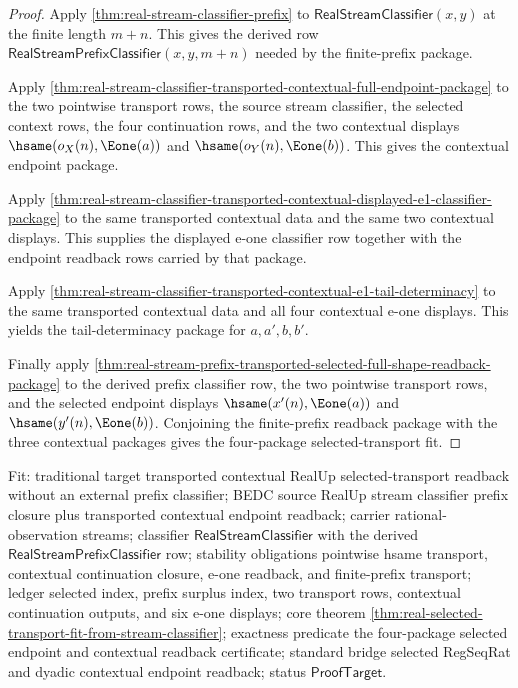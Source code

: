 \begin{proof}
Apply \autoref{thm:real-stream-classifier-prefix} to
$\mathsf{RealStreamClassifier}(x,y)$ at the finite length $m+n$. This gives the
derived row $\mathsf{RealStreamPrefixClassifier}(x,y,m+n)$ needed by the
finite-prefix package.

Apply
\autoref{thm:real-stream-classifier-transported-contextual-full-endpoint-package}
to the two pointwise transport rows, the source stream classifier, the selected
context rows, the four continuation rows, and the two contextual displays
$\hsame(o_X(n),\Eone(a))$ and $\hsame(o_Y(n),\Eone(b))$. This gives the
contextual endpoint package.

Apply
\autoref{thm:real-stream-classifier-transported-contextual-displayed-e1-classifier-package}
to the same transported contextual data and the same two contextual displays.
This supplies the displayed e-one classifier row together with the endpoint
readback rows carried by that package.

Apply
\autoref{thm:real-stream-classifier-transported-contextual-e1-tail-determinacy}
to the same transported contextual data and all four contextual e-one displays.
This yields the tail-determinacy package for $a,a',b,b'$.

Finally apply
\autoref{thm:real-stream-prefix-transported-selected-full-shape-readback-package}
to the derived prefix classifier row, the two pointwise transport rows, and the
selected endpoint displays $\hsame(x'(n),\Eone(a))$ and
$\hsame(y'(n),\Eone(b))$. Conjoining the finite-prefix readback package with the
three contextual packages gives the four-package selected-transport fit.
\end{proof}

Fit: traditional target transported contextual RealUp selected-transport
readback without an external prefix classifier; BEDC source RealUp stream
classifier prefix closure plus transported contextual endpoint readback; carrier
rational-observation streams; classifier $\mathsf{RealStreamClassifier}$ with
the derived $\mathsf{RealStreamPrefixClassifier}$ row; stability obligations
pointwise hsame transport, contextual continuation closure, e-one readback, and
finite-prefix transport; ledger selected index, prefix surplus index, two
transport rows, contextual continuation outputs, and six e-one displays; core
theorem \autoref{thm:real-selected-transport-fit-from-stream-classifier};
exactness predicate the four-package selected endpoint and contextual readback
certificate; standard bridge selected RegSeqRat and dyadic contextual endpoint
readback; status $\mathsf{ProofTarget}$.

